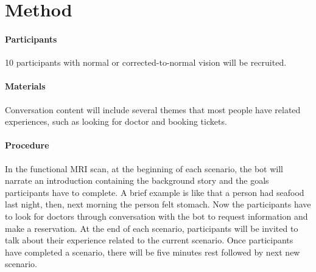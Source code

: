 \documentclass[man, floatsintext, draftfirst]{apa6}
\begin{document}
\section*{Method}

\paragraph*{Participants}
10 participants with normal or corrected-to-normal vision will be recruited.

\paragraph*{Materials}
Conversation content will include several themes that most people have related experiences, such as looking for doctor and booking tickets.

\paragraph*{Procedure}
In the functional MRI scan, at the beginning of each scenario, the bot will narrate an introduction containing the background story and the goals participants have to complete. A brief example is like that a person had seafood last night, then, next morning the person felt stomach. Now the participants have to look for doctors through conversation with the bot to request information and make a reservation. At the end of each scenario, participants will be invited to talk about their experience related to the current scenario. Once participants have completed a scenario, there will be five minutes rest followed by next new scenario.\\


\printbibliography
\end{document}

